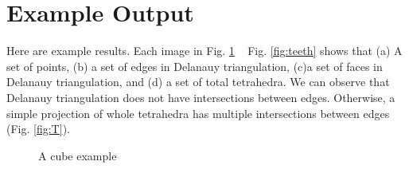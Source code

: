 \documentclass[11pt]{article}
\begin{document}
\section{Example Output}
 Here are example results. Each image in Fig. \ref{fig:cube} ~ Fig. \ref{fig:teeth} shows that (a) A set of points, (b) a set of edges in Delanauy triangulation, (c)a set of faces in Delanauy triangulation, and (d) a set of total tetrahedra. We can observe that Delanauy triangulation does not have intersections between edges. Otherwise, a simple projection of whole tetrahedra has multiple intersections between edges (Fig. \ref{fig:T}).
\begin{figure}[hbt]
 \centering
  \hspace{-3mm}
  \hspace{-3mm}
  \hspace{-3mm}
 \hspace{-3mm}
   \caption{A cube example\label{fig:cube}}
\end{figure}
\end{document}

